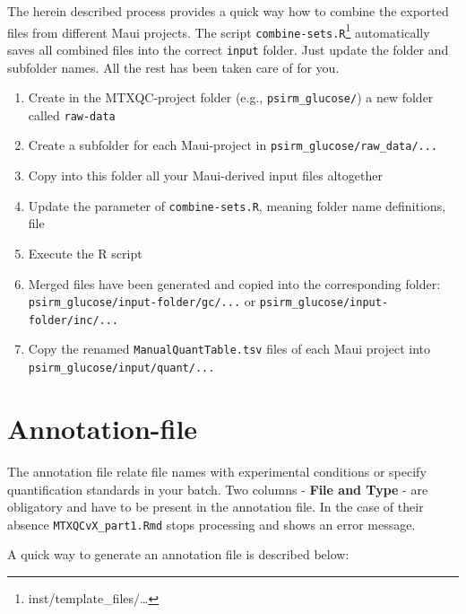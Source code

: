\documentclass[]{book}
\providecommand{\tightlist}{%
  \setlength{\itemsep}{0pt}\setlength{\parskip}{0pt}}
\let\rmarkdownfootnote\footnote%
\def\footnote{\protect\rmarkdownfootnote}
\theoremstyle{definition}
\theoremstyle{definition}
\theoremstyle{definition}
\theoremstyle{remark}
\begin{document}
The herein described process provides a quick way how to combine the
exported files from different Maui projects. The script
\texttt{combine-sets.R}\footnote{inst/template\_files/\ldots{}}
automatically saves all combined files into the correct \texttt{input}
folder. Just update the folder and subfolder names. All the rest has
been taken care of for you.

\begin{enumerate}
\def\labelenumi{\arabic{enumi}.}
\tightlist
\item
  Create in the MTXQC-project folder (e.g., \texttt{psirm\_glucose/}) a
  new folder called \texttt{raw-data}
\item
  Create a subfolder for each Maui-project in
  \texttt{psirm\_glucose/raw\_data/...}
\item
  Copy into this folder all your Maui-derived input files altogether
\item
  Update the parameter of \texttt{combine-sets.R}, meaning folder name
  definitions, file
\item
  Execute the R script
\item
  Merged files have been generated and copied into the corresponding
  folder: \texttt{psirm\_glucose/input-folder/gc/...} or
  \texttt{psirm\_glucose/input-folder/inc/...}
\item
  Copy the renamed \texttt{ManualQuantTable.tsv} files of each Maui
  project into \texttt{psirm\_glucose/input/quant/...}
\end{enumerate}

\section{Annotation-file}\label{annotation-file}

The annotation file relate file names with experimental conditions or
specify quantification standards in your batch. Two columns -
\textbf{File and Type} - are obligatory and have to be present in the
annotation file. In the case of their absence
\texttt{MTXQCvX\_part1.Rmd} stops processing and shows an error message.

A quick way to generate an annotation file is described below:
\end{document}

